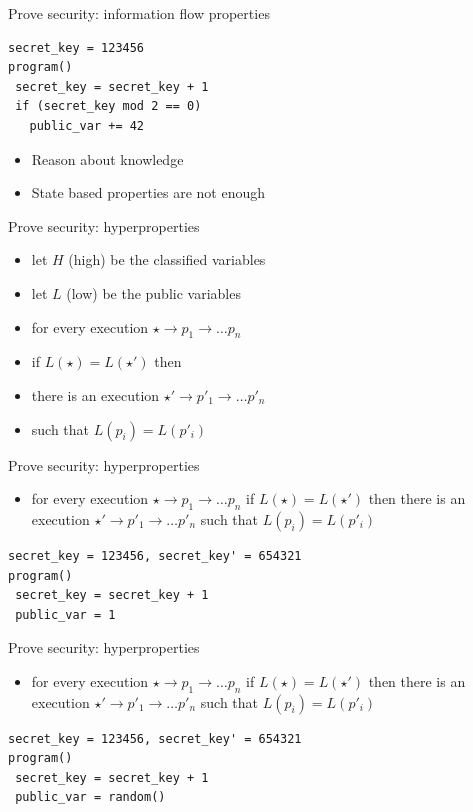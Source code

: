 \documentclass{beamer}
\begin{document}
\begin{frame}[fragile]{Prove security: information flow properties}
  \begin{verbatim}
secret_key = 123456
program()
 secret_key = secret_key + 1
 if (secret_key mod 2 == 0)
   public_var += 42
  \end{verbatim}
  \begin{itemize}
  \item Reason about knowledge
  \item<2-> State based properties are not enough
  \end{itemize}
\end{frame}

\begin{frame}{Prove security: hyperproperties}
  \begin{itemize}
  \item let $H$ (high) be the classified variables
  \item let $L$ (low) be the public variables
  \item for every execution $\star \rightarrow p_1 \rightarrow \dots p_n$
  \item if $L(\star) = L(\star')$ then
  \item there is an execution  $\star' \rightarrow p'_1 \rightarrow \dots p'_n$
  \item such that $L(p_i) = L(p'_i)$
  \end{itemize}
\end{frame}

\begin{frame}[fragile]{Prove security: hyperproperties}
  \begin{itemize}
  \item for every execution $\star \rightarrow p_1 \rightarrow \dots p_n$
    if $L(\star) = L(\star')$  then there is an execution
    $\star' \rightarrow p'_1 \rightarrow \dots p'_n$
  such that $L(p_i) = L(p'_i)$
  \end{itemize}
  \begin{verbatim}
secret_key = 123456, secret_key' = 654321
program()
 secret_key = secret_key + 1
 public_var = 1
  \end{verbatim}
\end{frame}

\begin{frame}[fragile]{Prove security: hyperproperties}
  \begin{itemize}
  \item for every execution $\star \rightarrow p_1 \rightarrow \dots p_n$
    if $L(\star) = L(\star')$  then there is an execution
    $\star' \rightarrow p'_1 \rightarrow \dots p'_n$
  such that $L(p_i) = L(p'_i)$
  \end{itemize}
  \begin{verbatim}
secret_key = 123456, secret_key' = 654321
program()
 secret_key = secret_key + 1
 public_var = random()
  \end{verbatim}
\end{frame}
\end{document}
